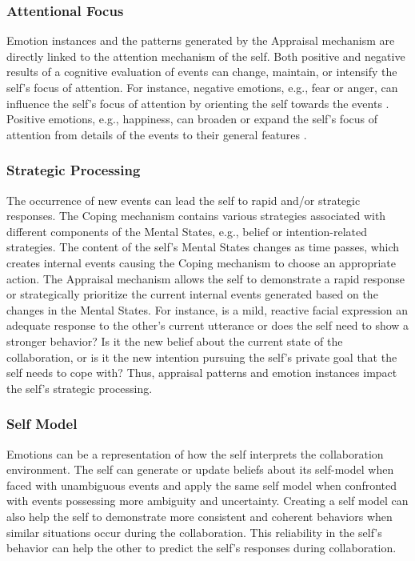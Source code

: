 \documentclass[12pt]{report}
\begin{document}
\subsubsection{Attentional Focus} Emotion instances and the patterns generated
by the Appraisal mechanism are directly linked to the attention mechanism of the
self. Both positive and negative results of a cognitive evaluation of events
can change, maintain, or intensify the self's focus of attention. For instance,
negative emotions, e.g., fear or anger, can influence the self's focus of
attention by orienting the self towards the events
\cite{faucher:fear-attention}. Positive emotions, e.g., happiness, can broaden
or expand the self's focus of attention from details of the events to their
general features \cite{fredrickson:positive-emotion-attention}.

\subsubsection{Strategic Processing} The occurrence of new events can lead the
self to rapid and/or strategic responses. The Coping mechanism contains various
strategies associated with different components of the Mental States, e.g.,
belief or intention-related strategies. The content of the self's Mental States
changes as time passes, which creates internal events causing the Coping
mechanism to choose an appropriate action. The Appraisal mechanism allows the
self to demonstrate a rapid response or strategically prioritize the current
internal events generated based on the changes in the Mental States. For
instance, is a mild, reactive facial expression an adequate response to the
other's current utterance or does the self need to show a stronger behavior? Is
it the new belief about the current state of the collaboration, or is it the new
intention pursuing the self's private goal that the self needs to cope with?
Thus, appraisal patterns and emotion instances impact the self's strategic
processing.

\subsubsection{Self Model} Emotions can be a representation of how the self
interprets the collaboration environment. The self can generate or update
beliefs about its self-model when faced with unambiguous events and apply the
same self model when confronted with events possessing more ambiguity and
uncertainty. Creating a self model can also help the self to demonstrate more
consistent and coherent behaviors when similar situations occur during the
collaboration. This reliability in the self's behavior can help the other to
predict the self's responses during collaboration.
\end{document}
